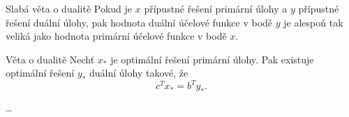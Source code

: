 \begin{vetaN}{Slabá věta o dualitě}
Pokud je $x$ přípustné řešení primární úlohy a $y$ přípustné řešení duální úlohy, pak
hodnota duální účelové funkce v bodě $y$ je alespoň tak veliká jako hodnota primární účelové
funkce v bodě $x$.
\end{vetaN}

\begin{vetaN}{Věta o dualitě}
Nechť $x_*$ je optimální řešení primární úlohy. Pak existuje optimální řešení $y_*$ duální úlohy takové, že
\[
c^Tx_* = b^Ty_*.
\]
\end{vetaN}
\bigskip


\dots 



